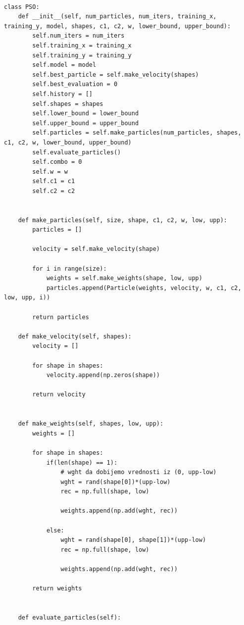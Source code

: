 \documentclass[a4paper]{article}
\begin{document}
\begin{lstlisting}

class PSO:
    def __init__(self, num_particles, num_iters, training_x, training_y, model, shapes, c1, c2, w, lower_bound, upper_bound):
        self.num_iters = num_iters
        self.training_x = training_x
        self.training_y = training_y
        self.model = model
        self.best_particle = self.make_velocity(shapes)
        self.best_evaluation = 0
        self.history = []
        self.shapes = shapes
        self.lower_bound = lower_bound
        self.upper_bound = upper_bound
        self.particles = self.make_particles(num_particles, shapes, c1, c2, w, lower_bound, upper_bound)
        self.evaluate_particles()
        self.combo = 0
        self.w = w
        self.c1 = c1
        self.c2 = c2
        
        
    def make_particles(self, size, shape, c1, c2, w, low, upp):
        particles = []
        
        velocity = self.make_velocity(shape)
        
        for i in range(size):
            weights = self.make_weights(shape, low, upp)
            particles.append(Particle(weights, velocity, w, c1, c2, low, upp, i))
            
        return particles
    
    def make_velocity(self, shapes):
        velocity = []
        
        for shape in shapes:
            velocity.append(np.zeros(shape))
        
        return velocity
                
        
    def make_weights(self, shapes, low, upp):
        weights = []
        
        for shape in shapes:
            if(len(shape) == 1):
                # wght da dobijemo vrednosti iz (0, upp-low)
                wght = rand(shape[0])*(upp-low)
                rec = np.full(shape, low)
                
                weights.append(np.add(wght, rec))
                
            else:
                wght = rand(shape[0], shape[1])*(upp-low)
                rec = np.full(shape, low)
                
                weights.append(np.add(wght, rec))
                
        return weights
        
        
    def evaluate_particles(self):
        

\end{lstlisting}
\end{document}
